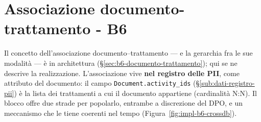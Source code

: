 \section{Associazione documento-trattamento - B6}
\label{sec:impl-b6}
\label{sub:b6-associazione}

Il concetto dell'associazione documento--trattamento --- e la gerarchia fra le sue modalità --- è in architettura (§\ref{sec:b6-documento-trattamento}); qui se ne descrive la realizzazione. L'associazione vive \textbf{nel registro delle PII}, come attributo del documento: il campo \texttt{Document.activity\_ids} (§\ref{sub:dati-registro-pii}) è la lista dei trattamenti a cui il documento appartiene (cardinalità N:N). Il blocco offre due strade per popolarlo, entrambe a discrezione del DPO, e un meccanismo che le tiene coerenti nel tempo (Figura~\ref{fig:impl-b6-crossdb}).

